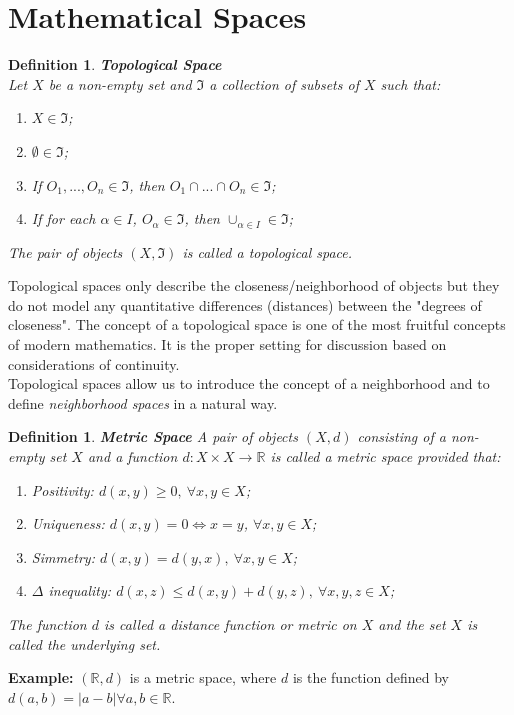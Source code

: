 \documentclass[twoside]{article}
\newtheorem{definition}[theorem]{Definition}
\begin{document}
\section{Mathematical Spaces}
\begin{definition} \textbf{Topological Space} \\
Let $X$ be a non-empty set and $\Im$ a collection of subsets of $X$ such that:
\renewcommand{\theenumi}{\Roman{enumi}}
\begin{enumerate}
    \item $X \in \Im$;
    \item $\emptyset \in \Im$;
    \item If $O_1,...,O_n \in \Im$, then $O_1 \cap... \cap O_n \in \Im$;
    \item If for each $\alpha \in I$, $O_\alpha \in \Im$, then $\cup_{\alpha \in I} \in \Im$;
\end{enumerate}
The pair of objects $(X, \Im)$ is called a topological space.
\end{definition}
Topological spaces only describe the closeness/neighborhood of objects but they do not model any quantitative differences (distances) between the "degrees of closeness". The concept of a topological space is one of the most fruitful concepts of modern mathematics. It is the proper setting for discussion based on considerations of continuity.\\
Topological spaces allow us to introduce the concept of a neighborhood and to define \textit{neighborhood spaces} in a natural way.
\begin{definition} \textbf{Metric Space}
A pair of objects $(X, d)$ consisting of a non-empty set $X$ and a function $d: X \times X \rightarrow \mathbb{R}$ is called a metric space provided that:
\renewcommand{\theenumi}{\Roman{enumi}}
\begin{enumerate}
    \item Positivity: $d(x,y) \geq 0, \: \forall x, y \in X$;
    \item Uniqueness: $d(x,y) = 0 \Leftrightarrow x = y$, \: $\forall x,y \in X$;
    \item Simmetry: $d(x,y) = d(y,x), \: \forall x, y \in X$;
    \item $\Delta$ inequality: $d(x,z) \leq d(x,y) + d(y,z), \: \forall x, y, z \in X$;
\end{enumerate}
The function $d$ is called a distance function or metric on $X$ and the set $X$ is called the underlying set.
\end{definition}
\textbf{Example:} $(\mathbb{R}, d)$ is a metric space, where $d$ is the function defined by $d(a,b) = |a-b| \forall a,b \in \mathbb{R}$.
\end{document}
